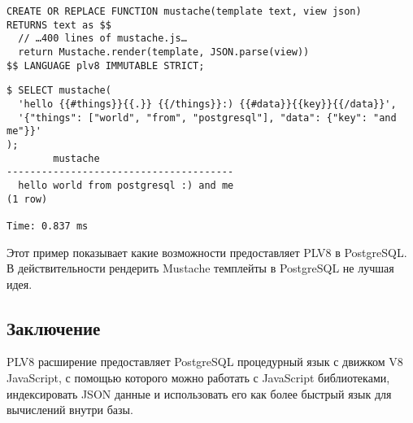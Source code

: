 \begin{lstlisting}[label=lst:plv8js15,caption=Функция для рендера Mustache темплейтов]
CREATE OR REPLACE FUNCTION mustache(template text, view json)
RETURNS text as $$
  // …400 lines of mustache.js…
  return Mustache.render(template, JSON.parse(view))
$$ LANGUAGE plv8 IMMUTABLE STRICT;
\end{lstlisting}

\begin{lstlisting}[label=lst:plv8js16,caption=Рендер темплейтов]
$ SELECT mustache(
  'hello {{#things}}{{.}} {{/things}}:) {{#data}}{{key}}{{/data}}',
  '{"things": ["world", "from", "postgresql"], "data": {"key": "and me"}}'
);
		mustache
---------------------------------------
  hello world from postgresql :) and me
(1 row)

Time: 0.837 ms
\end{lstlisting}

Этот пример показывает какие возможности предоставляет PLV8 в PostgreSQL. В действительности рендерить Mustache темплейты в PostgreSQL не лучшая идея.

\subsection{Заключение}

PLV8 расширение предоставляет PostgreSQL процедурный язык с движком V8 JavaScript, с помощью которого можно работать с JavaScript библиотеками, индексировать JSON данные и использовать его как более быстрый язык для вычислений внутри базы.
